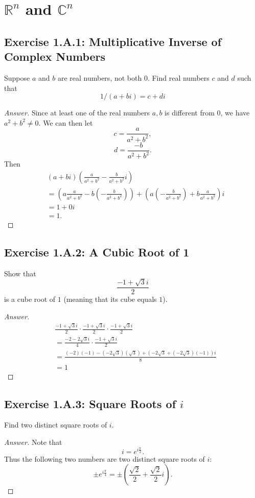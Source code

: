 \chapter{$\mathbb{R}^n$ and $\mathbb{C}^n$}
\section{Exercise 1.A.1: Multiplicative Inverse of Complex Numbers}
Suppose $a$ and $b$ are real numbers, not both $0$. Find real numbers $c$ and $d$ such that
\[
1/(a+bi)=c+di
\]
\begin{proof}[Answer]
Since at least one of the real numbers $a, b$ is different from $0$, we have $a^2+b^2\ne 0$. We can then let
\[
c=\frac{a}{a^2+b^2},
\]
\[
d=\frac{-b}{a^2+b^2}.
\]
Then
\begin{equation*}
\begin{split}
&\left(a+bi\right)\left(\frac{a}{a^2+b^2}-\frac{b}{a^2+b^2}i\right)\\
&=\left(a\frac{a}{a^2+b^2}-b\left(-\frac{b}{a^2+b^2}\right)\right) + \left(a\left(-\frac{b}{a^2+b^2}\right)+b\frac{a}{a^2+b^2}\right)i\\
&=1 + 0i\\
&=1.
\end{split}
\end{equation*}
\end{proof}

\section{Exercise 1.A.2: A Cubic Root of 1}
Show that
\[
\frac{-1+\sqrt{3}i}{2}
\]
is a cube root of $1$ (meaning that its cube equals $1$).
\begin{proof}[Answer]
\begin{equation*}
\begin{split}
&\frac{-1+\sqrt{3}i}{2}\cdot\frac{-1+\sqrt{3}i}{2}\cdot\frac{-1+\sqrt{3}i}{2}\\
&=\frac{-2-2\sqrt{3}i}{4}\cdot\frac{-1+\sqrt{3}i}{2}\\
&=\frac{(-2)(-1)-(-2\sqrt{3})(\sqrt{3})+(-2\sqrt{3}+(-2\sqrt{3})(-1))i}{8}\\
&=1
\end{split}
\end{equation*}
\end{proof}

\section{Exercise 1.A.3: Square Roots of $i$}
Find two distinct square roots of $i$.
\begin{proof}[Answer]
Note that 
\[
i=e^{i\frac{\pi}{2}}.
\]
Thus the following two numbers are two distinct square roots of $i$:
\[
\pm e^{i\frac{\pi}{4}} = \pm (\frac{\sqrt{2}}{2} + \frac{\sqrt{2}}{2}i).
\]
\end{proof}

